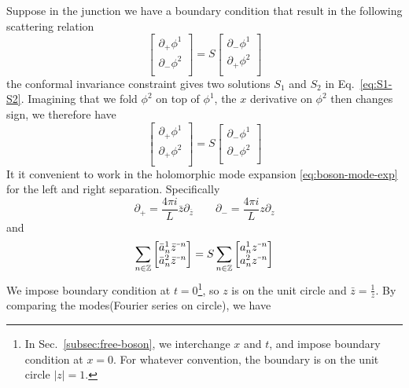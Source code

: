 \documentclass{article}
\begin{document}
Suppose in the junction we have a boundary condition that result in the following scattering relation
\begin{equation}
\begin{bmatrix}
\partial_{+} \phi^1 \\
\partial_{-} \phi^2 \\
\end{bmatrix}
 = S
\begin{bmatrix}
\partial_{-} \phi^1 \\
\partial_{+} \phi^2 \\
\end{bmatrix}
\end{equation}
the conformal invariance constraint gives two solutions $S_1$ and $S_2$ in Eq.~\eqref{eq:S1-S2}. Imagining that we fold $\phi^2$ on top of $\phi^1$, the $x$ derivative on $\phi^2$ then changes sign, we therefore have
\begin{equation}
\begin{bmatrix}
\partial_{+} \phi^1 \\
\partial_{+} \phi^2 \\
\end{bmatrix}
 = S
\begin{bmatrix}
\partial_{-} \phi^1 \\
\partial_{-} \phi^2 \\
\end{bmatrix}
\end{equation}
It it convenient to work in the holomorphic mode expansion \eqref{eq:boson-mode-exp} for the left and right separation. Specifically
\begin{equation}
\partial_{+} = \frac{4\pi i }{L} \bar{z} \partial_{\bar{z}} \qquad \partial_{-} = \frac{4\pi i }{L} z\partial_{z}
\end{equation}
and
\begin{equation}
\sum_{n \in \mathbb{Z}}  
\begin{bmatrix}
\bar{a}^1_{n} \bar{z}^{\scalebox{0.5}[0.8]{\( - \)}n}\\ 
\bar{a}^2_{n} \bar{z}^{\scalebox{0.5}[0.8]{\( - \)}n} 
\end{bmatrix}
 = S
\sum_{n \in \mathbb{Z}}
\begin{bmatrix}
a^1_n z^{\scalebox{0.5}[0.8]{\( - \)}n} \\
a^2_n z^{\scalebox{0.5}[0.8]{\( - \)}n} \\
\end{bmatrix}
\end{equation}
We impose boundary condition at $t = 0$\footnote{In Sec.~\ref{subsec:free-boson}, we interchange $x$ and $t$, and impose boundary condition at $x = 0$. For whatever convention, the boundary is on the unit circle $|z| = 1$. }, so $z$  is on the unit circle and $\bar{z} = \frac{1}{z}$. By comparing the modes(Fourier series on circle), we have
\end{document}
